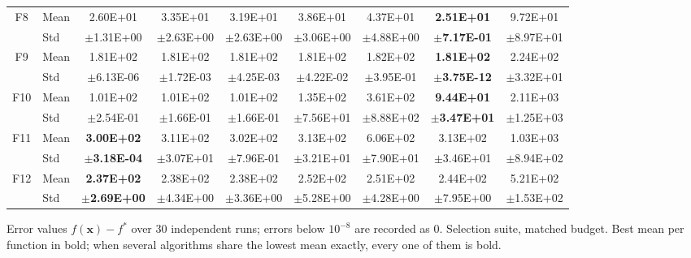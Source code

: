 \begin{table}[htbp]
{\begin{tabular}{clccccccc}
F8 & Mean & 2.60E+01 & 3.35E+01 & 3.19E+01 & 3.86E+01 & 4.37E+01 & \textbf{2.51E+01} & 9.72E+01 \\
 & Std & $\pm$1.31E+00 & $\pm$2.63E+00 & $\pm$2.63E+00 & $\pm$3.06E+00 & $\pm$4.88E+00 & $\pm$\textbf{7.17E-01} & $\pm$8.97E+01 \\
F9 & Mean & 1.81E+02 & 1.81E+02 & 1.81E+02 & 1.81E+02 & 1.82E+02 & \textbf{1.81E+02} & 2.24E+02 \\
 & Std & $\pm$6.13E-06 & $\pm$1.72E-03 & $\pm$4.25E-03 & $\pm$4.22E-02 & $\pm$3.95E-01 & $\pm$\textbf{3.75E-12} & $\pm$3.32E+01 \\
F10 & Mean & 1.01E+02 & 1.01E+02 & 1.01E+02 & 1.35E+02 & 3.61E+02 & \textbf{9.44E+01} & 2.11E+03 \\
 & Std & $\pm$2.54E-01 & $\pm$1.66E-01 & $\pm$1.66E-01 & $\pm$7.56E+01 & $\pm$8.88E+02 & $\pm$\textbf{3.47E+01} & $\pm$1.25E+03 \\
F11 & Mean & \textbf{3.00E+02} & 3.11E+02 & 3.02E+02 & 3.13E+02 & 6.06E+02 & 3.13E+02 & 1.03E+03 \\
 & Std & $\pm$\textbf{3.18E-04} & $\pm$3.07E+01 & $\pm$7.96E-01 & $\pm$3.21E+01 & $\pm$7.90E+01 & $\pm$3.46E+01 & $\pm$8.94E+02 \\
F12 & Mean & \textbf{2.37E+02} & 2.38E+02 & 2.38E+02 & 2.52E+02 & 2.51E+02 & 2.44E+02 & 5.21E+02 \\
 & Std & $\pm$\textbf{2.69E+00} & $\pm$4.34E+00 & $\pm$3.36E+00 & $\pm$5.28E+00 & $\pm$4.28E+00 & $\pm$7.95E+00 & $\pm$1.53E+02 \\
\bottomrule
\end{tabular}}
\begin{flushleft}\footnotesize
Error values $f(\mathbf{x})-f^{*}$ over 30 independent runs; errors below $10^{-8}$ are recorded as 0. Selection suite, matched budget. Best mean per function in bold; when several algorithms share the lowest mean exactly, every one of them is bold.
\end{flushleft}
\end{table}
